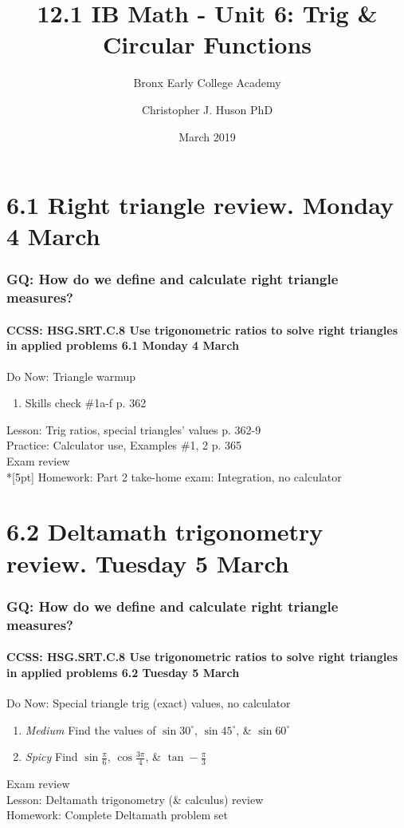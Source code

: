 \documentclass{beamer}
\title{12.1 IB Math - Unit 6: Trig \& Circular Functions}
\subtitle{Bronx Early College Academy}
\author{Christopher J. Huson PhD}
\date{March 2019}
\begin{document}
\frame{\titlepage}

\section[Outline]{}
\frame{\tableofcontents}

\section{6.1 Right triangle review. Monday 4 March}
  \frame
  {
    \frametitle{GQ: How do we define and calculate right triangle measures?}
    \framesubtitle{CCSS: HSG.SRT.C.8 Use trigonometric ratios to solve right triangles in applied problems \hfill \alert{6.1 Monday 4 March}}

    \begin{block}{Do Now: Triangle warmup}
    \begin{enumerate}
        \item Skills check \#1a-f p. 362
    \end{enumerate}
    \end{block}
    Lesson: Trig ratios, special triangles' values p. 362-9\\
    Practice: Calculator use, Examples \#1, 2  p. 365\\
    Exam review\\*[5pt]
    Homework: Part 2 take-home exam: Integration, no calculator
  }

  \section{6.2 Deltamath trigonometry review. Tuesday 5 March}
  \frame
  {
    \frametitle{GQ: How do we define and calculate right triangle measures?}
    \framesubtitle{CCSS: HSG.SRT.C.8 Use trigonometric ratios to solve right triangles in applied problems \hfill \alert{6.2 Tuesday 5 March}}

      \begin{block}{Do Now: Special triangle trig (exact) values, no calculator}
      \begin{enumerate}
          \item \emph{Medium} Find the values of $\sin 30^\circ$, $\sin 45^\circ$, \& $\sin 60^\circ$
          \item \emph{Spicy} Find $\sin \frac{\pi}{6}$, $\cos \frac{3\pi}{4}$, \& $\tan -\frac{\pi}{3}$
      \end{enumerate}
      \end{block}
    Exam review\\
    Lesson: Deltamath trigonometry (\& calculus) review\\
    Homework: Complete Deltamath problem set
  }
\end{document}
